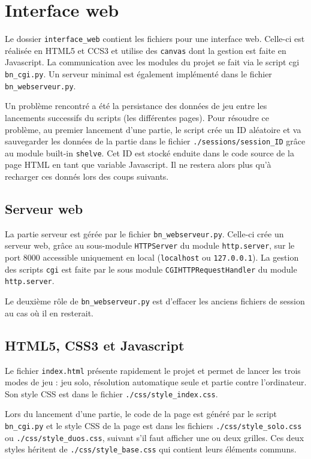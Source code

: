 \chapter{Interface web}

Le dossier \texttt{interface\_web} contient les fichiers pour une interface web. Celle-ci est réalisée en HTML5 et CCS3 et utilise des \texttt{canvas} dont la gestion est faite en Javascript. La communication avec les modules du projet se fait via le script cgi \texttt{bn\_cgi.py}. Un serveur minimal est également implémenté dans le fichier \texttt{bn\_webserveur.py}.

Un problème rencontré a été la persistance des données de jeu entre les lancements successifs du scripts (les différentes pages). Pour résoudre ce problème, au premier lancement d'une partie, le script crée un ID aléatoire et va sauvegarder les données de la partie dans le fichier \texttt{./sessions/session\_ID} grâce au module built-in \texttt{shelve}. Cet ID est stocké enduite dans le code source de la page HTML en tant que variable Javascript. Il ne restera alors plus qu'à recharger ces donnés lors des coups suivants.

\section{Serveur web}
La partie serveur est gérée par le fichier \texttt{bn\_webserveur.py}.
Celle-ci crée un serveur web, grâce au sous-module \texttt{HTTPServer} du module  \texttt{http.server}, sur le port 8000 accessible uniquement en local (\texttt{localhost} ou \texttt{127.0.0.1}). La gestion des scripts \texttt{cgi} est faite par le sous module \texttt{CGIHTTPRequestHandler} du module \texttt{http.server}.

Le deuxième rôle de \texttt{bn\_webserveur.py} est d'effacer les anciens fichiers de session au cas où il en resterait.

\section{HTML5, CSS3 et Javascript}
Le fichier \texttt{index.html} présente rapidement le projet et permet de lancer les trois modes de jeu : jeu solo, résolution automatique seule et partie contre l'ordinateur. Son style CSS est dans le fichier \texttt{./css/style\_index.css}.

Lors du lancement d'une partie, le code de la page est généré par le script \texttt{bn\_cgi.py} et le style CSS de la page est dans les fichiers \texttt{./css/style\_solo.css} ou \texttt{./css/style\_duos.css}, suivant s'il faut afficher une ou deux grilles. Ces deux styles héritent de \texttt{./css/style\_base.css} qui contient leurs éléments communs.

